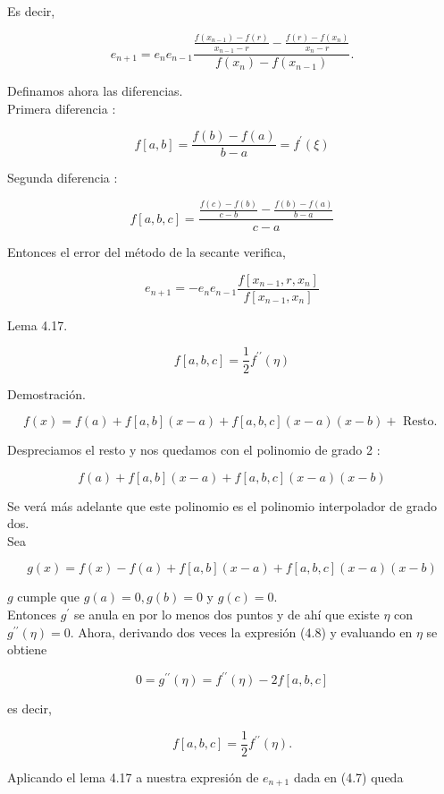 \documentclass[10pt]{article}
\begin{document}
Es decir,


\begin{equation*}
e_{n+1}=e_{n} e_{n-1} \frac{\frac{f\left(x_{n-1}\right)-f(r)}{x_{n-1}-r}-\frac{f(r)-f\left(x_{n}\right)}{x_{n}-r}}{f\left(x_{n}\right)-f\left(x_{n-1}\right)} . \tag{4.7}
\end{equation*}


Definamos ahora las diferencias.\\
Primera diferencia :

$$
f[a, b]=\frac{f(b)-f(a)}{b-a}=f^{\prime}(\xi)
$$

Segunda diferencia :

$$
f[a, b, c]=\frac{\frac{f(c)-f(b)}{c-b}-\frac{f(b)-f(a)}{b-a}}{c-a}
$$

Entonces el error del método de la secante verifica,

$$
e_{n+1}=-e_{n} e_{n-1} \frac{f\left[x_{n-1}, r, x_{n}\right]}{f\left[x_{n-1}, x_{n}\right]}
$$

Lema 4.17.

$$
f[a, b, c]=\frac{1}{2} f^{\prime \prime}(\eta)
$$

Demostración.

$$
f(x)=f(a)+f[a, b](x-a)+f[a, b, c](x-a)(x-b)+\text { Resto. }
$$

Despreciamos el resto y nos quedamos con el polinomio de grado 2 :

$$
f(a)+f[a, b](x-a)+f[a, b, c](x-a)(x-b)
$$

Se verá más adelante que este polinomio es el polinomio interpolador de grado dos.\\
Sea


\begin{equation*}
g(x)=f(x)-f(a)+f[a, b](x-a)+f[a, b, c](x-a)(x-b) \tag{4.8}
\end{equation*}


$g$ cumple que $g(a)=0, g(b)=0$ y $g(c)=0$.\\
Entonces $g^{\prime}$ se anula en por lo menos dos puntos y de ahí que existe $\eta$ con $g^{\prime \prime}(\eta)=0$. Ahora, derivando dos veces la expresión (4.8) y evaluando en $\eta$ se obtiene

$$
0=g^{\prime \prime}(\eta)=f^{\prime \prime}(\eta)-2 f[a, b, c]
$$

es decir,

$$
f[a, b, c]=\frac{1}{2} f^{\prime \prime}(\eta) .
$$

Aplicando el lema 4.17 a nuestra expresión de $e_{n+1}$ dada en (4.7) queda
\end{document}
